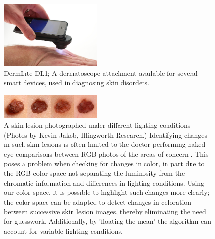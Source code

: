 %

\begin{figure}[h!]
  \centering
    \includegraphics[width=0.45\textwidth]{Chapter5/Figs/DermLite-DL1.jpg}
    \caption{DermLite DL1; A dermatoscope attachment available for several smart devices, used in diagnosing skin disorders.}\label{fig:DermatoscopePhone}
\end{figure}

\begin{figure}[h!]
  \centering
    \includegraphics[width=0.45\textwidth]{Chapter5/Figs/melanoma-images.jpg}
    \caption{A skin lesion photographed under different lighting conditions. (Photos by Kevin Jakob, Illingworth Research.)
    Identifying changes in such skin lesions is often limited to the doctor performing naked-eye comparisons between RGB photos of the areas of concern . This poses a problem when checking for changes in color, in part due to the RGB color-space not separating the luminosity from the chromatic information and differences in lighting conditions. Using our color-space, it is possible to highlight such changes more clearly; the color-space can be adapted to detect changes in coloration between successive skin lesion images, thereby eliminating the need for guesswork. Additionally, by 'floating the mean' the algorithm can account for variable lighting conditions.}\label{fig:MelanomaImages}
\end{figure}

